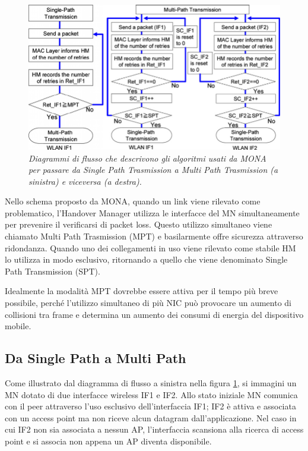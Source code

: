 \documentclass[12pt,a4paper,openright,twoside]{book}
\begin{document}
\begin{figure}
  \centering
  \includegraphics[width=12cm]{img/mona-sp-mp}
  \caption{\em Diagrammi di flusso che descrivono gli algoritmi usati da
    MONA per passare da Single Path Trasmission a Multi Path Trasmission
    (a sinistra) e viceversa (a destra).}
  \label{fig:mona:sp-mp}
\end{figure}

Nello schema proposto da MONA, quando un link viene rilevato come
problematico, l'Handover Manager utilizza le interfacce del MN
simultaneamente per prevenire il verificarsi di packet loss. Questo
utilizzo simultaneo viene chiamato Multi Path Trasmission (MPT) e
basilarmente offre sicurezza attraverso ridondanza. Quando uno dei
collegamenti in uso viene rilevato come stabile HM lo utilizza in modo
esclusivo, ritornando a quello che viene denominato Single Path
Transmission (SPT).

Idealmente la modalità MPT dovrebbe essere attiva
per il tempo più breve possibile, perché l'utilizzo simultaneo di più
NIC può provocare un aumento di collisioni tra frame e determina un
aumento dei consumi di energia del dispositivo mobile.

\subsection{Da Single Path a Multi Path}

Come illustrato dal diagramma di flusso a sinistra nella figura
\ref{fig:mona:sp-mp}, si immagini un MN dotato di due interfacce
wireless IF1 e IF2. Allo stato iniziale MN comunica con il peer
attraverso l'uso esclusivo dell'interfaccia IF1; IF2 è attiva e
associata con un access point ma non riceve alcun datagram
dall'applicazione. Nel caso in cui IF2 non sia associata a nessun AP,
l'interfaccia scansiona alla ricerca di access point e si associa non
appena un AP diventa disponibile.
\end{document}
